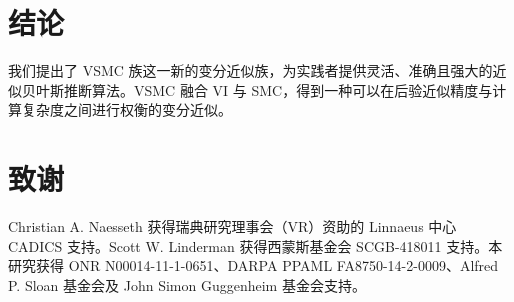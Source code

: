 \section{结论}
我们提出了 VSMC 族这一新的变分近似族，为实践者提供灵活、准确且强大的近似贝叶斯推断算法。VSMC 融合 VI 与 SMC，得到一种可以在后验近似精度与计算复杂度之间进行权衡的变分近似。

\section*{致谢}
Christian A. Naesseth 获得瑞典研究理事会（VR）资助的 Linnaeus 中心 CADICS 支持。Scott W. Linderman 获得西蒙斯基金会 SCGB-418011 支持。本研究获得 ONR N00014-11-1-0651、DARPA PPAML FA8750-14-2-0009、Alfred P. Sloan 基金会及 John Simon Guggenheim 基金会支持。
